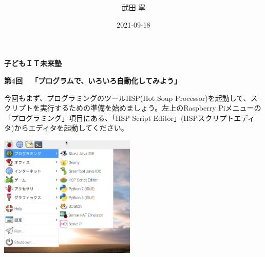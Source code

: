 \documentclass[a4paper,dvipdfmx]{jarticle}
\title{ }
\author{武田 寧}
\date{2021-09-18}
\begin{document}
\clearpage\clearpage\setcounter{page}{1}\pagestyle{MP}

\bigskip


\bigskip


\bigskip


\bigskip


\bigskip


\bigskip


\bigskip


\bigskip


\bigskip


\bigskip


\bigskip


\bigskip


\bigskip


\bigskip


\bigskip


\bigskip


\bigskip


\bigskip

{\bfseries
子どもＩＴ未来塾}

{\bfseries
第4回\ \ 「プログラムで、いろいろ自動化してみよう」}


\bigskip



\bigskip

今回もまず、プログラミングのツールHSP(Hot
Soup
Processor)を起動して、スクリプトを実行するための準備を始めましょう。左上のRaspberry
Piメニューの「プログラミング」項目にある、「HSP
Script
Editor」(HSPスクリプトエディタ)からエディタを起動してください。


\bigskip



\begin{center}
\includegraphics[width=6.489cm,height=5.826cm]{text04-img/text04-img001.png}

\end{center}
\end{document}
